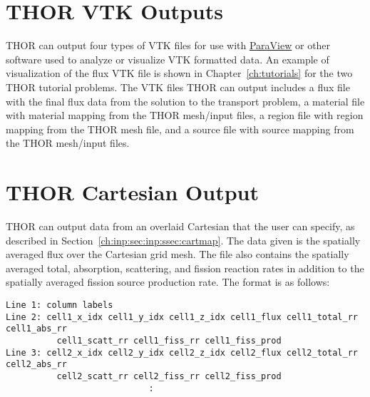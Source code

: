 \section{THOR VTK Outputs}\label{ch:out:sec:vtk}

\ac{THOR} can output four types of VTK files for use with \href{https://www.paraview.org/}{ParaView} or other software used to analyze or visualize VTK formatted data.
An example of visualization of the flux VTK file is shown in Chapter~\ref{ch:tutorials} for the two \ac{THOR} tutorial problems.
The VTK files \ac{THOR} can output includes a flux file with the final flux data from the solution to the transport problem, a material file with material mapping from the \ac{THOR} mesh/input files, a region file with region mapping from the \ac{THOR} mesh file, and a source file with source mapping from the \ac{THOR} mesh/input files.

\section{THOR Cartesian Output}\label{ch:out:sec:cart}

\ac{THOR} can output data from an overlaid Cartesian that the user can specify, as described in Section~\ref{ch:inp:sec:inp:ssec:cartmap}.
The data given is the spatially averaged flux over the Cartesian grid mesh.
The file also contains the spatially averaged total, absorption, scattering, and fission reaction rates in addition to the spatially averaged fission source production rate.
The format is as follows:
\begin{verbatim}
Line 1: column labels
Line 2: cell1_x_idx cell1_y_idx cell1_z_idx cell1_flux cell1_total_rr cell1_abs_rr
          cell1_scatt_rr cell1_fiss_rr cell1_fiss_prod
Line 3: cell2_x_idx cell2_y_idx cell2_z_idx cell2_flux cell2_total_rr cell2_abs_rr
          cell2_scatt_rr cell2_fiss_rr cell2_fiss_prod
                            :
\end{verbatim}